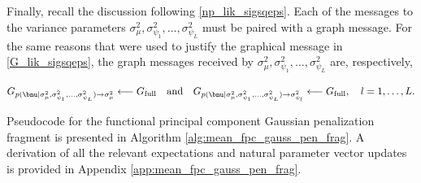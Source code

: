 \documentclass[ba]{imsart}
\numberwithin{equation}{section}
\theoremstyle{plain}
\def\sigsqmu{\sigma^2_{\mu}}
\newcommand\sigsqpsi[1]{\sigma^2_{\psi_{#1}}}
\begin{document}
Finally, recall the discussion following \eqref{np_lik_sigsqeps}.
Each of the messages to the variance parameters $\sigsqmu,
\sigsqpsi{1}, \dots, \sigsqpsi{L}$ must be paired with a graph message. For the same reasons that were used to
justify the graphical message in \eqref{G_lik_sigsqeps}, the graph messages received by $\sigsqmu,
\sigsqpsi{1}, \dots, \sigsqpsi{L}$ are, respectively,

\begin{equation}
	G_{p (\bnu | \sigsqmu, \sigsqpsi{1}, \dots, \sigsqpsi{L}) \rightarrow \sigsqmu}
		\longleftarrow
			G_{\text{full}} \quad
	\text{and} \quad
	G_{p (\bnu | \sigsqmu, \sigsqpsi{1}, \dots, \sigsqpsi{L}) \rightarrow \sigsqpsi{l}}
		\longleftarrow
			G_{\text{full}}, \quad l = 1, \dots, L.
\label{G_pen}
\end{equation}

Pseudocode for the functional principal component Gaussian penalization fragment is presented in Algorithm
\ref{alg:mean_fpc_gauss_pen_frag}.
A derivation of all the relevant expectations and natural parameter vector updates is provided in Appendix
\ref{app:mean_fpc_gauss_pen_frag}.
\end{document}
